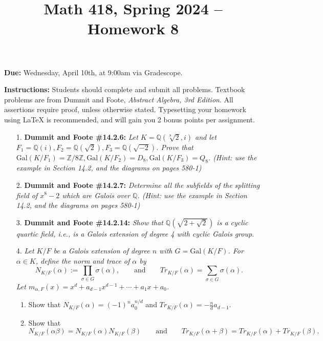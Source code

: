 \documentclass[12pt]{article}
\title{Math 418, Spring 2024 -- Homework 8}
\date{}
\newcommand{\Z}{\mathbb{Z}}
\newcommand{\Q}{\mathbb{Q}}
\newcommand{\Gal}{\text{Gal}}
\begin{document}
 \maketitle
\vspace{-80pt}

\textbf{Due:} Wednesday, April 10th, at 9:00am via Gradescope.

\textbf{Instructions:} Students should complete and submit all problems. Textbook problems are from Dummit and Foote, \emph{Abstract Algebra, 3rd Edition}. All assertions require proof, unless otherwise stated. Typesetting your homework using LaTeX is recommended, and will gain you 2 bonus points per assignment.

\begin{enumerate}

\item[1.] \textbf{Dummit and Foote \#14.2.6:} \textit{Let $K = \Q(\sqrt[8]{2}, i)$ and let $F_1 = \Q(i), F_2 = \Q(\sqrt{2}) , F_3 = \Q(\sqrt{-2})$. Prove that $\Gal(K/F_1) = \Z/8\Z, \Gal(K/F_2) = D_8, \Gal(K/F_3) = Q_8$. (Hint: use the example in Section 14.2, and the diagrams on pages 580-1)}

\item[2.] \textbf{Dummit and Foote \#14.2.7:} \textit{Determine all the subfields of the splitting field of $x^8 - 2$ which are Galois over $\Q$. (Hint: use the example in Section 14.2, and the diagrams on pages 580-1)}

\item[3.] \textbf{Dummit and Foote \#14.2.14:} \textit{Show that $\Q(\sqrt{2+\sqrt{2}})$ is a cyclic quartic field, i.e., is a Galois extension of degree 4 with
cyclic Galois group.}

\item[4.] \textit{Let $K/F$ be a Galois extension of degree $n$ with $G = \Gal(K/F)$. For $\alpha\in K$, define the norm and trace of $\alpha$ by \[N_{K/F}(\alpha) := \prod_{\sigma\in G} \sigma(\alpha), \qquad \text{and} \qquad Tr_{K/F}(\alpha) = \sum_{\sigma\in G} \sigma(\alpha).\] Let $m_{\alpha,F}(x) = x^d + a_{d-1}x^{d-1} + \cdots + a_1x + a_0$.}

\begin{enumerate}
    \item Show that $N_{K/F}(\alpha) = (-1)^n a_0^{n/d}$ and $Tr_{K/F}(\alpha) = -\frac{n}{d}a_{d-1}$.

    \item Show that \[N_{K/F}(\alpha\beta) = N_{K/F}(\alpha)N_{K/F}(\beta)\qquad \text{and} \qquad Tr_{K/F}(\alpha+\beta) = Tr_{K/F}(\alpha)+Tr_{K/F}(\beta).\]


\end{enumerate}
\end{enumerate}
\end{document}
